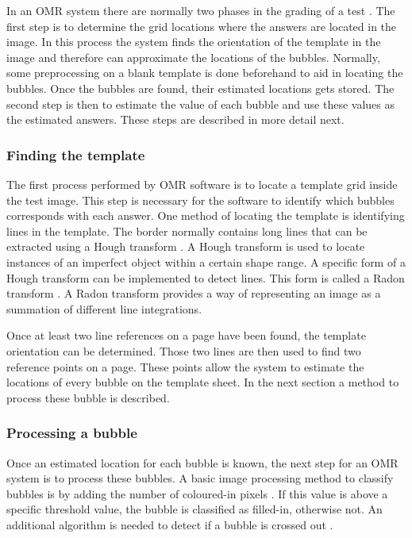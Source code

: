 In an OMR system there are normally two phases in the grading of a test \citep{DraganI2003}. The first step is to determine the grid locations where the answers are located in the image. In this process the system finds the orientation of the template in the image and therefore can approximate the locations of the bubbles. Normally, some preprocessing on a blank template is done beforehand to aid in locating the bubbles. Once the bubbles are found, their estimated locations gets stored. The second step is then to estimate the value of each bubble and use these values as the estimated answers. These steps are described in more detail next.

\subsubsection{Finding the template}

The first process performed by OMR software is to locate a template grid inside the test image. This step is necessary for the software to identify which bubbles corresponds with each answer. One method of locating the template is identifying lines in the template. The border normally contains long lines that can be extracted using a Hough transform \citep{MVGI2015}. A Hough transform is used to locate instances of an imperfect object within a certain shape range. A specific form of a Hough transform can be implemented to detect lines. This form is called a Radon transform \citep{MathWorks}. A Radon transform provides a way of representing an image as a summation of different line integrations.

Once at least two line references on a page have been found, the template orientation can be determined. Those two lines are then used to find two reference points on a page. These points allow the system to estimate the locations of every bubble on the template sheet. In the next section a method to process these bubble is described.

\subsubsection{Processing a bubble}

Once an estimated location for each bubble is known, the next step for an OMR system is to process these bubbles. A basic image processing method to classify bubbles is by adding the number of coloured-in pixels \citep{MVGI2015}. If this value is above a specific threshold value, the bubble is classified as filled-in, otherwise not. An additional algorithm is needed to detect if a bubble is crossed out .

